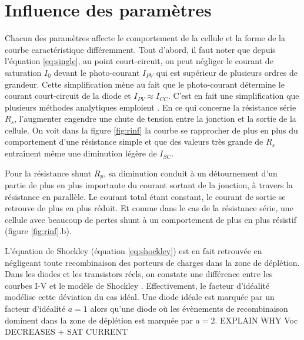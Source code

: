 \section{Influence des paramètres}
Chacun des paramètres affecte le comportement de la cellule et la forme de la courbe caractéristique différemment. Tout d'abord, il faut noter que depuis l'équation \ref{eq:single}, au point court-circuit, on peut négliger le courant de saturation $I_0$ devant le photo-courant $I_{PV}$ qui est supérieur de plusieurs ordres de grandeur. Cette simplification mène au fait que le photo-courant détermine le courant court-circuit de la diode et $I_{PV} \approx I_{CC}$. C'est en fait une simplification que plusieurs méthodes analytiques emploient \cite{Tsai2008, Villalva2009}. En ce qui concerne la résistance série $R_s$, l'augmenter engendre une chute de tension entre la jonction et la sortie de la cellule. On voit dans la figure \ref{fig:rinf} la courbe se rapprocher de plus en plus du comportement d'une résistance simple et que des valeurs très grande de $R_s$ entraînent même une diminution légère de $I_{SC}$.

Pour la résistance shunt $R_p$, sa diminution conduit à un détournement d'un partie de plus en plus importante du courant sortant de la jonction, à travers la résistance en parallèle. Le courant total étant constant, le courant de sortie se retrouve de plus en plus réduit. Et comme dans le cas de la résistance série, une cellule avec beaucoup de pertes shunt à un comportement de plus en plus résistif (figure \ref{fig:rinf}.b).

L'équation de Shockley (équation \ref{eq:shockley}) est en fait retrouvée en négligeant toute recombinaison des porteurs de charges dans la zone de déplétion. Dans les diodes et les transistors réels, on constate une différence entre les courbes I-V et le modèle de Shockley \cite{Shockley1949}. Effectivement, le facteur d'idéalité modélise cette déviation du cas idéal. Une diode idéale est marquée par un facteur d'idéalité $a = 1$ alors qu'une diode où les évènements de recombinaison dominent dans la zone de déplétion est marquée par $a = 2$. EXPLAIN WHY Voc DECREASES + SAT CURRENT


